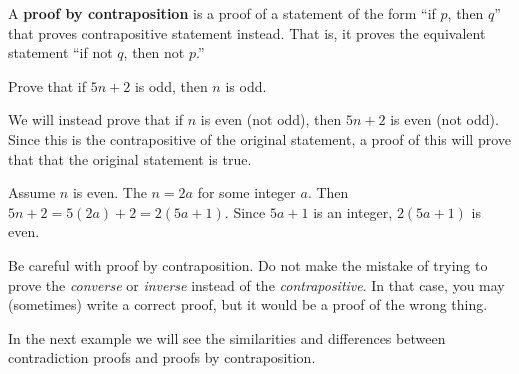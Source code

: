 \begin{df}
A {\bf proof by contraposition} is a proof of a statement of the form ``if $p$, then $q$''  that proves
contrapositive statement instead.  
That is, it proves the equivalent statement ``if not $q$, then not $p$.''
\end{df}

\begin{exa}
Prove that if $5n+2$ is odd, then $n$ is odd.
\begin{pf}
We will instead prove that if $n$ is even (not odd), then $5n+2$ is even (not odd).  Since
this is the contrapositive of the original statement,  a proof of this will prove that that
the original statement is true.

Assume $n$ is even.  The $n=2a$ for some integer $a$.  Then $5n+2=5(2a)+2 = 2(5a+1)$.
Since $5a+1$ is an integer, $2(5a+1)$ is even.
\end{pf}
\end{exa}

Be careful with proof by contraposition. Do not make the mistake of trying to
prove the {\em converse} or {\em inverse} instead of the {\em contrapositive}.
In that case, you may (sometimes) write a correct proof, but it would be a proof of the wrong thing.

In the next example we will see the similarities and differences between contradiction
proofs and proofs by contraposition.

